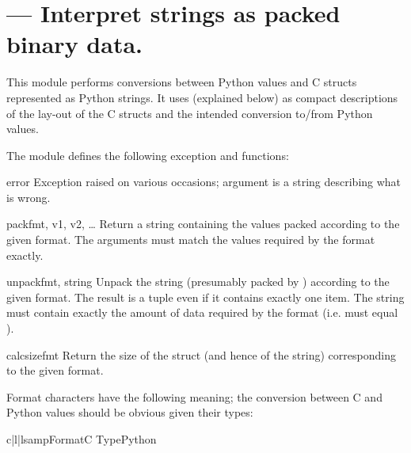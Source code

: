 \section{ ---
         Interpret strings as packed binary data.}



This module performs conversions between Python values and C
structs represented as Python strings.  It uses 
(explained below) as compact descriptions of the lay-out of the C
structs and the intended conversion to/from Python values.

The module defines the following exception and functions:


\begin{excdesc}{error}
  Exception raised on various occasions; argument is a string
  describing what is wrong.
\end{excdesc}

\begin{funcdesc}{pack}{fmt, v1, v2, {\rm \ldots}}
  Return a string containing the values
   packed according to the given
  format.  The arguments must match the values required by the format
  exactly.
\end{funcdesc}

\begin{funcdesc}{unpack}{fmt, string}
  Unpack the string (presumably packed by )
  according to the given format.  The result is a tuple even if it
  contains exactly one item.  The string must contain exactly the
  amount of data required by the format (i.e.   must
  equal ).
\end{funcdesc}

\begin{funcdesc}{calcsize}{fmt}
  Return the size of the struct (and hence of the string)
  corresponding to the given format.
\end{funcdesc}

Format characters have the following meaning; the conversion between C
and Python values should be obvious given their types:

\begin{tableiii}{c|l|l}{samp}{Format}{C Type}{Python}
\end{tableiii}


